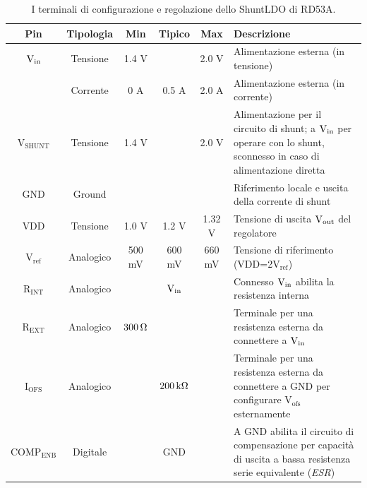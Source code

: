 \begin{table}
\begin{small}
\noindent\setlength\tabcolsep{4pt}%
\begin{tabularx}{\linewidth}{c|c|c|c|c|X}
\textbf{Pin} & \textbf{Tipologia} & \textbf{Min} & \textbf{Tipico} & \textbf{Max} & \textbf{Descrizione} \\ \hline
$\mathrm{V_{in}}$ & Tensione & 1.4 V & & 2.0 V & Alimentazione esterna (in tensione)\\
 & Corrente & 0 A & 0.5 A & 2.0 A & Alimentazione esterna (in corrente)\\ \hline 
$\mathrm{V_{SHUNT}}$ & Tensione & 1.4 V & & 2.0 V & Alimentazione per il circuito di shunt; a $\mathrm{\mathrm{V_{in}}}$ per operare con lo shunt, sconnesso in caso di alimentazione diretta\\ \hline
GND & Ground &  & &  & Riferimento locale e uscita della corrente di shunt\\ \hline
VDD & Tensione & 1.0 V & 1.2 V & 1.32 V & Tensione di uscita $\mathrm{V_{out}}$ del regolatore\\ \hline
$\mathrm{V_{ref}}$ & Analogico & 500 mV & 600 mV & 660 mV & Tensione di riferimento (VDD=2$\mathrm{V_{ref}}$)\\ \hline
$\mathrm{R_{INT}}$ & Analogico &  & $\mathrm{\mathrm{V_{in}}}$ &  & Connesso $\mathrm{\mathrm{V_{in}}}$ abilita la resistenza interna\\ \hline
$\mathrm{R_{EXT}}$ & Analogico & $300{\rm \, \Omega}$ &  &  & Terminale per una resistenza esterna da connettere a $\mathrm{\mathrm{V_{in}}}$\\ \hline
$\mathrm{I_{OFS}}$ & Analogico &  & $200{\rm \, k\Omega}$ &  & Terminale per una resistenza esterna da connettere a GND per configurare $\mathrm{V_{ofs}}$ esternamente\\ \hline
$\mathrm{COMP_{ENB}}$ & Digitale &  & GND &  & A GND abilita il circuito di compensazione per capacit\`a di uscita a bassa resistenza serie equivalente ({\em ESR})\\
\end{tabularx}
\end{small}
\caption{I terminali di configurazione e regolazione dello ShuntLDO di RD53A.}
\label{tab:sldord53a}
\end{table}

